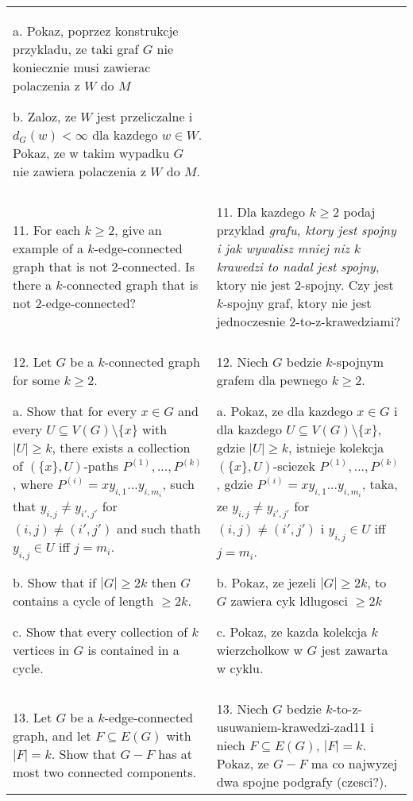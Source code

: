 \documentclass{article}[13pt]
\begin{document}
\begin{tabularx}{\textwidth}{ X X }
        a. Pokaz, poprzez konstrukcje przykladu, ze taki graf $G$ nie koniecznie musi zawierac polaczenia z $W$ do $M$

        b. Zaloz, ze $W$ jest przeliczalne i $d_G(w)<\infty$ dla kazdego $w\in W$. Pokaz, ze w takim wypadku $G$ nie zawiera polaczenia z $W$ do $M$.\\

        & \\

        11. For each $k\geq 2$, give an example of a $k$-edge-connected graph that is not $2$-connected. Is there a $k$-connected graph that is not $2$-edge-connected? & 11. Dla kazdego $k\geq 2$ podaj przyklad \emph{grafu, ktory jest spojny i jak wywalisz mniej niz $k$ krawedzi to nadal jest spojny}, ktory nie jest $2$-spojny. Czy jest $k$-spojny graf, ktory nie jest jednoczesnie $2$-to-z-krawedziami?\\

        & \\

        12. Let $G$ be a $k$-connected graph for some $k\geq2$.

        a. Show that for every $x\in G$ and every $U\subseteq V(G)\setminus\{x\}$ with $|U|\geq k$, there exists a collection of $(\{x\}, U)$-paths $P^{(1)},...,P^{(k)}$, where $P^{(i)}=xy_{i,1}...y_{i,m_i}$, such that $y_{i,j}\neq y_{i',j'}$ for $(i,j)\neq (i',j')$ and such thath $y_{i,j}\in U$ iff $j=m_i$.

        b. Show that if $|G|\geq2k$ then $G$ contains a cycle of length $\geq2k$.

        c. Show that every collection of $k$ vertices in $G$ is contained in a cycle. & 12. Niech $G$ bedzie $k$-spojnym grafem dla pewnego $k\geq2$.

        a. Pokaz, ze dla kazdego $x\in G$ i dla kazdego $U\subseteq V(G)\setminus\{x\}$, gdzie $|U|\geq k$, istnieje kolekcja $(\{x\}, U)$-sciezek $P^{(1)},...,P^{(k)}$, gdzie $P^{(i)}=xy_{i,1}...y_{i,m_i}$, taka, ze $y_{i,j}\neq y_{i',j'}$ for $(i,j)\neq (i',j')$ i $y_{i,j}\in U$ iff $j=m_i$.

        b. Pokaz, ze jezeli $|G|\geq2k$, to $G$ zawiera cyk ldlugosci $\geq2k$

        c. Pokaz, ze kazda kolekcja $k$ wierzcholkow w $G$ jest zawarta w cyklu.\\

        & \\

        13. Let $G$ be a $k$-edge-connected graph, and let $F\subseteq E(G)$ with $|F|=k$. Show that $G-F$ has at most two connected components. & 13. Niech $G$ bedzie $k$-to-z-usuwaniem-krawedzi-zad11 i niech $F\subseteq E(G)$, $|F|=k$. Pokaz, ze $G-F$ ma co najwyzej dwa spojne podgrafy (czesci?).\\


\end{tabularx}
\end{document}

